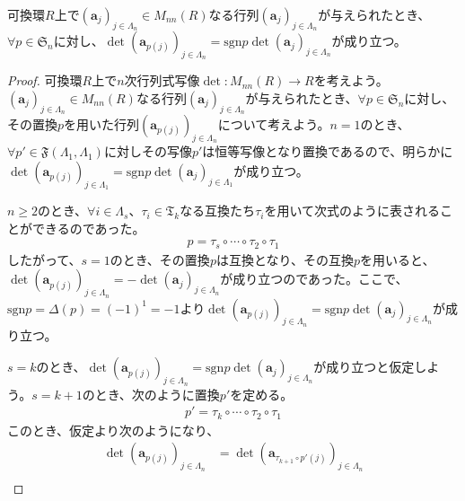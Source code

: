 \documentclass[dvipdfmx]{jsarticle}
\begin{document}
\begin{thm}\label{2.1.11.3}
可換環$R$上で$\left( \mathbf{a}_{j} \right)_{j \in \varLambda_{n}} \in M_{nn}(R)$なる行列$\left( \mathbf{a}_{j} \right)_{j \in \varLambda_{n}}$が与えられたとき、$\forall p \in \mathfrak{S}_{n}$に対し、$\det\left( \mathbf{a}_{p(j)} \right)_{j \in \varLambda_{n}} = {\mathrm{sgn} }p\det\left( \mathbf{a}_{j} \right)_{j \in \varLambda_{n}}$が成り立つ。
\end{thm}
\begin{proof}
可換環$R$上で$n$次行列式写像$\det:M_{nn}(R) \rightarrow R$を考えよう。$\left( \mathbf{a}_{j} \right)_{j \in \varLambda_{n}} \in M_{nn}(R)$なる行列$\left( \mathbf{a}_{j} \right)_{j \in \varLambda_{n}}$が与えられたとき、$\forall p \in \mathfrak{S}_{n}$に対し、その置換$p$を用いた行列$\left( \mathbf{a}_{p(j)} \right)_{j \in \varLambda_{n}}$について考えよう。$n = 1$のとき、$\forall p'\in \mathfrak{F}\left( \varLambda_{1},\varLambda_{1} \right)$に対しその写像$p'$は恒等写像となり置換であるので、明らかに$\det\left( \mathbf{a}_{p(j)} \right)_{j \in \varLambda_{1}} = {\mathrm{sgn} }p\det\left( \mathbf{a}_{j} \right)_{j \in \varLambda_{1}}$が成り立つ。\par
$n \geq 2$のとき、$\forall i \in \varLambda_{s}$、$\tau_{i} \in \mathfrak{T}_{k}$なる互換たち$\tau_{i}$を用いて次式のように表されることができるのであった。
\begin{align*}
p = \tau_{s} \circ \cdots \circ \tau_{2} \circ \tau_{1}
\end{align*}
したがって、$s = 1$のとき、その置換$p$は互換となり、その互換$p$を用いると、$\det\left( \mathbf{a}_{p(j)} \right)_{j \in \varLambda_{n}} = - \det\left( \mathbf{a}_{j} \right)_{j \in \varLambda_{n}}$が成り立つのであった。ここで、${\mathrm{sgn} }p = \Delta(p) = ( - 1)^{1} = - 1$より$\det\left( \mathbf{a}_{p(j)} \right)_{j \in \varLambda_{n}} = {\mathrm{sgn} }p\det\left( \mathbf{a}_{j} \right)_{j \in \varLambda_{n}}$が成り立つ。\par
$s = k$のとき、$\det\left( \mathbf{a}_{p(j)} \right)_{j \in \varLambda_{n}} = {\mathrm{sgn} }p\det\left( \mathbf{a}_{j} \right)_{j \in \varLambda_{n}}$が成り立つと仮定しよう。$s = k + 1$のとき、次のように置換$p'$を定める。
\begin{align*}
p' = \tau_{k} \circ \cdots \circ \tau_{2} \circ \tau_{1}
\end{align*}
このとき、仮定より次のようになり、
\begin{align*}
\det\left( \mathbf{a}_{p(j)} \right)_{j \in \varLambda_{n}} &= \det\left( \mathbf{a}_{\tau_{k + 1} \circ p'(j)} \right)_{j \in \varLambda_{n}}\\

\end{align*}
\end{proof}
\end{document}
